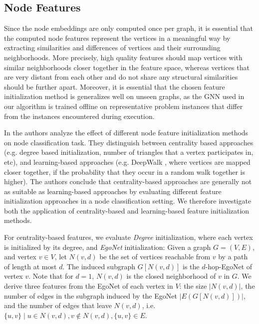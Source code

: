 \documentclass[draft,final]{vutinfth} %
\begin{document}
\subsection{Node Features}
Since the node embeddings are only computed once per graph, it is essential that the computed node features represent the vertices in a meaningful way by extracting similarities and differences of vertices and their surrounding neighborhoods. More precisely, high quality features should map vertices with similar neighborhoods closer together in the feature space, whereas vertices that are very distant from each other and do not share any structural similarities should be further apart. Moreover, it is essential that the chosen feature initialization method is generalizes well on unseen graphs, as the GNN used in our algorithm is trained offline on representative problem instances that differ from the instances encountered during execution. 

In \cite{Duong2019} the authors analyze the effect of different node feature initialization methods on node classification task. They distinguish between centrality based approaches (e.g. degree based initialization, number of triangles that a vertex participates in, etc), and learning-based approaches (e.g. DeepWalk \cite{Perozzi2014}, where vertices are mapped closer together, if the probability that they occur in a random walk together is higher). 
The authors conclude that centrality-based approaches are generally not as suitable as learning-based approaches by evaluating different feature initialization approaches in a node classification setting. 
We therefore investigate both the application of centrality-based and learning-based feature initialization methods. 

For centrality-based features, we evaluate \emph{Degree} initialization, where each vertex is initialized by its degree, and \emph{EgoNet} initialization: Given a graph $G = (V, E)$, and vertex $v \in V$, let $N(v, d)$ be the set of vertices reachable from $v$ by a path of length at most $d$. The induced subgraph $G[N(v, d)]$ is the $d$-hop-EgoNet of vertex $v$. Note that for $d=1$, $N(v, d)$ is the closed neighborhood of $v$ in $G$. We derive three features from the EgoNet of each vertex in $V$: the size $|N(v, d)|$, the number of edges in the subgraph induced by the EgoNet $|E(G[N(v, d)])|$, and the number of edges that leave $N(v, d)$, i.e. ${\{u, v\} \mid u \in N(v,d), v \notin N(v,d), \{u,v\} \in E}$.     
\end{document}
